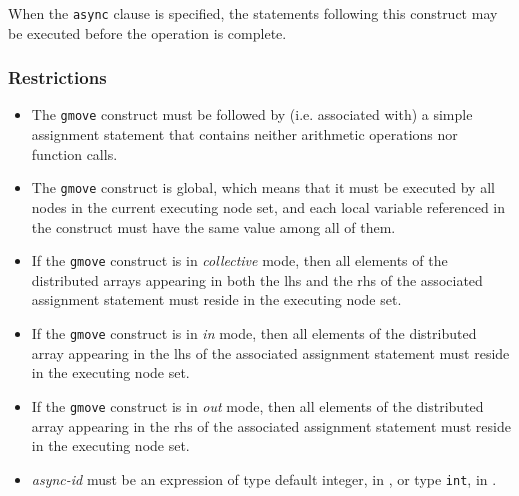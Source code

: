 When the {\tt async} clause is specified, the statements following this
construct may be executed before the operation is complete.

\subsubsection*{Restrictions}

\begin{itemize}
 \item The {\tt gmove} construct must be followed by (i.e. associated
       with) a simple assignment statement that contains neither
       arithmetic operations nor function calls.
 \item The {\tt gmove} construct is global, which means that it must be
       executed by all nodes in the current executing node set, and each local
       variable referenced in the construct must have the same value
       among all of them.
 \item If the {\tt gmove} construct is in {\it collective} mode, then
       all elements of the distributed arrays appearing in both the
       lhs and the rhs of the associated assignment
       statement must reside in the executing node set.
 \item If the {\tt gmove} construct is in {\it in} mode, then
       all elements of the distributed array appearing in the lhs of the
       associated assignment statement must reside in the executing node
       set.
 \item If the {\tt gmove} construct is in {\it out} mode, then
       all elements of the distributed array appearing in the rhs of the
       associated assignment statement must reside in the executing node
       set.
 \item {\it async-id} must be an expression of type default integer, in
       {\XMPF}, or type {\tt int}, in {\XMPC}.
\end{itemize}

